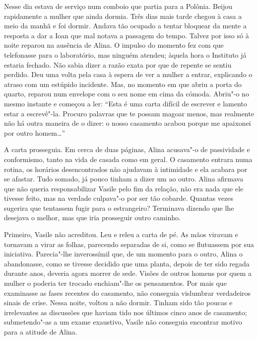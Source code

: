 Nesse dia estava de serviço num comboio que partia para a Polônia.
Beijou rapidamente a mulher que ainda dormia. Três dias mais tarde
chegou à casa a meio da manhã e foi dormir. Andava tão ocupado a tentar
bloquear da mente a resposta a dar a Ioan que mal notava a passagem do
tempo. Talvez por isso só à noite reparou na ausência de Alina. O
impulso do momento fez com que telefonasse para o laboratório, mas
ninguém atendeu; àquela hora o Instituto já estaria fechado. Não sabia
dizer a razão exata por que de repente se sentiu perdido. Deu uma volta
pela casa à espera de ver a mulher a entrar, explicando o atraso com um
estúpido incidente. Mas, no momento em que abriu a porta do quarto,
reparou num
envelope com o seu nome em cima da cómoda. Abriu"-o no mesmo instante e
começou a ler: ``Esta é uma carta difícil de escrever e lamento estar a
escrevê"-la. Procuro palavras que te possam magoar menos, mas realmente
não há outra maneira de o dizer: o nosso casamento acabou porque me
apaixonei por outro homem\ldots{}''

A carta prosseguia. Em cerca de duas páginas, Alina acusava"-o de
passividade e conformismo, tanto na vida de casada como em geral. O
casamento entrara numa rotina, os horários desencontrados não ajudavam à
intimidade e ela acabara por se afastar. Tudo somado, já pouco tinham a
dizer um ao outro. Alina afirmava que não queria responsabilizar
Vasile pelo fim da relação, não era nada que ele tivesse feito, mas na
verdade culpava"-o por ser tão cobarde. Quantas vezes sugerira que
tentassem fugir para o estrangeiro? Terminava dizendo que lhe desejava o
melhor, mas que iria prosseguir outro caminho.

Primeiro, Vasile não acreditou. Leu e releu a carta de pé. As mãos
viravam e tornavam a virar as folhas, parecendo separadas de si, como se
flutuassem por sua iniciativa. Parecia"-lhe inverossímil que, de um
momento para o outro, Alina o abandonasse, como se tivesse decidido que
uma planta, depois de ter sido regada durante anos, deveria agora morrer
de sede. Visões de outros homens por quem a mulher o poderia ter trocado
enchiam"-lhe os pensamentos. Por mais que examinasse as fases recentes
do casamento, não conseguia vislumbrar verdadeiros sinais de crise.
Nessa noite, voltou a não dormir. Tinham sido tão poucas e irrelevantes
as discussões que haviam tido nos últimos cinco anos de casamento;
submetendo"-as a um
exame exaustivo, Vasile não conseguia encontrar motivo para a atitude de
Alina.

